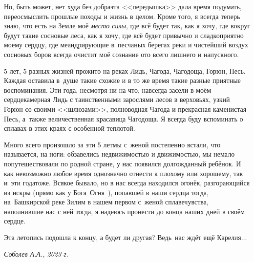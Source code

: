 {Но, быть может, нет худа без добра\mdash эта <<передышка>> дала время подумать, переосмыслить прошлые походы и жизнь в целом. Кроме того, я всегда теперь знаю, что есть на Земле моё \textit{место силы}, где всё будет так, как я хочу, где вокруг будут такие сосновые леса, как я хочу, где всё будет привычно и сладко\sdash приятно моему сердцу, где меандрирующие в~песчаных берегах реки и чистейший воздух сосновых боров всегда очистит моё сознание ото всего лишнего и напускного.

5 лет, 5 разных жизней прожито на реках Лидь, Чагода, Чагодоща, Горюн, Песь. Каждая оставила в~душе такие схожие и в то же время такие разные приятные воспоминания. Эти года, несмотря ни на что, навсегда засели в моём сердце\mdash камерная Лидь с таинственными зарослями лесов в верховьях, узкий Горюн со своими <<шлюзами>>, полноводная Чагода и прекрасная каменистая Песь, а~также величественная красавица Чагодоща. Я всегда буду вспоминать о сплавах в этих краях с особенной теплотой.

Много всего произошло за эти 5 лет\mdash мы с~женой постепенно встали, что называется, на ноги: обзавелись недвижимостью и движимостью, мы немало попутешествовали по родной стране, у нас появился долгожданный ребёнок. И как невозможно любое время однозначно отнести к плохому или хорошему, так и~эти года\mdash тоже. Всякое бывало, но в нас всегда находился огонёк, разгорающийся из искры (прямо как у Бога~Огня~\cite{Территория}), попавшей в наши сердца тогда, на~Башкирской реке Зилим в нашем первом с~женой сплаве\mdash чувства, наполнившие нас с ней тогда, я надеюсь пронести до конца наших дней в своём сердце.

Эта летопись подошла к концу, а будет ли другая? Ведь~нас ждёт ещё Карелия$\ldots$


}
\vspace{5mm}
\begin{flushright}
\textit{Соболев А.А., 2023 г.}
\end{flushright}
